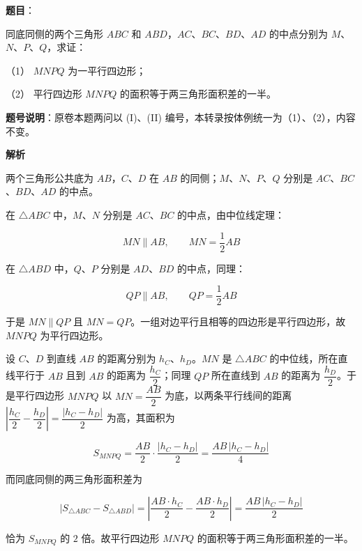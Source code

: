 \begin{answer}

\textbf{题目}：

同底同侧的两个三角形 $ABC$ 和 $ABD$，$AC$、$BC$、$BD$、$AD$ 的中点分别为 $M$、$N$、$P$、$Q$，求证：

（1） $MNPQ$ 为一平行四边形；

（2） 平行四边形 $MNPQ$ 的面积等于两三角形面积差的一半。

\begin{gktip}
\textbf{题号说明}：原卷本题两问以 (I)、(II) 编号，本转录按体例统一为（1）、（2），内容不变。
\end{gktip}

\textbf{解析}

两个三角形公共底为 $AB$，$C$、$D$ 在 $AB$ 的同侧；$M$、$N$、$P$、$Q$ 分别是 $AC$、$BC$、$BD$、$AD$ 的中点。


在 $\triangle ABC$ 中，$M$、$N$ 分别是 $AC$、$BC$ 的中点，由中位线定理：

\nopagebreak[4]
\[
MN\parallel AB,\qquad MN=\frac12 AB
\]

在 $\triangle ABD$ 中，$Q$、$P$ 分别是 $AD$、$BD$ 的中点，同理：

\nopagebreak[4]
\[
QP\parallel AB,\qquad QP=\frac12 AB
\]

于是 $MN\parallel QP$ 且 $MN=QP$。一组对边平行且相等的四边形是平行四边形，故 $MNPQ$ 为平行四边形。


设 $C$、$D$ 到直线 $AB$ 的距离分别为 $h_C$、$h_D$。$MN$ 是 $\triangle ABC$ 的中位线，所在直线平行于 $AB$ 且到 $AB$ 的距离为 $\dfrac{h_C}{2}$；同理 $QP$ 所在直线到 $AB$ 的距离为 $\dfrac{h_D}{2}$。于是平行四边形 $MNPQ$ 以 $MN=\dfrac{AB}{2}$ 为底，以两条平行线间的距离 $\left|\dfrac{h_C}{2}-\dfrac{h_D}{2}\right|=\dfrac{|h_C-h_D|}{2}$ 为高，其面积为

\nopagebreak[4]
\[
S_{MNPQ}=\frac{AB}{2}\cdot\frac{|h_C-h_D|}{2}=\frac{AB\,|h_C-h_D|}{4}
\]

而同底同侧的两三角形面积差为

\nopagebreak[4]
\[
\left|S_{\triangle ABC}-S_{\triangle ABD}\right|
=\left|\frac{AB\cdot h_C}{2}-\frac{AB\cdot h_D}{2}\right|
=\frac{AB\,|h_C-h_D|}{2}
\]

恰为 $S_{MNPQ}$ 的 $2$ 倍。故平行四边形 $MNPQ$ 的面积等于两三角形面积差的一半。



\end{answer}
